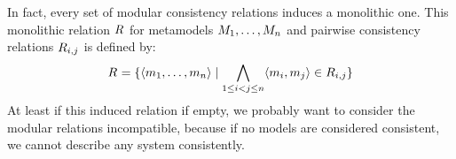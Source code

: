 In fact, every set of modular \glspl{consistency relation} induces a monolithic one.
This monolithic relation $R_{}$ for metamodels $M_{1}, \dots, M_{n}$ and pairwise consistency relations $R_{i,j}$ is defined by:
\begin{align*}
    R_{} = \{ \langle m_{1}, \dots, m_{n} \rangle \mid \bigwedge\limits_{1 \le i < j \le n} \langle m_{i}, m_{j} \rangle \in R_{i,j} \}
\end{align*}
At least if this induced relation if empty, we probably want to consider the modular relations incompatible, because if no models are considered consistent, we cannot describe any system consistently.





